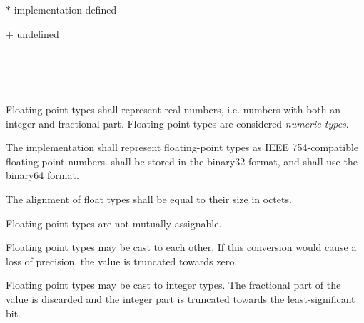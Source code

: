 $\ast$ implementation-defined

$+$ undefined


\begin{grammar}
 \\
	 \\
	 \\
\end{grammar}

\specsubsubitem
Floating-point types shall represent real numbers, i.e. numbers with both an
integer and fractional part. Floating point types are considered \textit{numeric
types}.

\specsubsubitem
The implementation shall represent floating-point types as IEEE 754-compatible
floating-point numbers.  shall be stored in the binary32 format,
and  shall use the binary64 format.

\specsubsubitem
The alignment of float types shall be equal to their size in octets.

\specsubsubitem
Floating point types are not mutually assignable.

\specsubsubitem
Floating point types may be cast to each other. If this conversion would cause a
loss of precision, the value is truncated towards zero.

\specsubsubitem
Floating point types may be cast to integer types. The fractional part of the
value is discarded and the integer part is truncated towards the
least-significant bit.


\begin{grammar}
 \\
	 \terminal{\{}  \terminal{\}} \\
	  \terminal{\{}  \terminal{\}} \\

 \\
	 \optional{\terminal{,}} \\
	 \terminal{,}  \\

 \\
	 \\
	 \terminal{=}  \\
\end{grammar}

